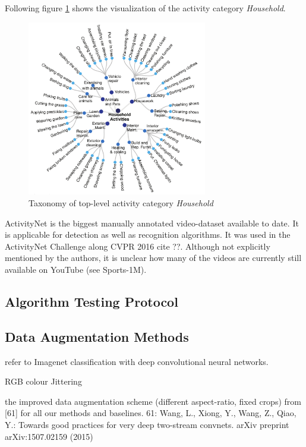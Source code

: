Following figure \ref{fig:activitynet_taxonomy} shows the visualization of the activity category \textit{Household}.
\begin{figure}[H]
    \centering
    \includegraphics[width=0.7\textwidth]{img_datasets/activitynet_taxonomy}
    \caption{Taxonomy of top-level activity category \textit{Household}}
    \label{fig:activitynet_taxonomy}
\end{figure}

ActivityNet is the biggest manually annotated video-dataset available to date.
It is applicable for detection as well as recognition algorithms.
It was used in the ActivityNet Challenge along CVPR 2016 cite ??.
Although not explicitly mentioned by the authors, it is unclear how many of the videos are currently still available on YouTube (see Sports-1M).


\subsection{Algorithm Testing Protocol}


\subsection{Data Augmentation Methods}

refer to Imagenet classification with deep convolutional neural networks.

RGB colour Jittering

the improved data augmentation scheme (different aspect-ratio, fixed crops)
from [61] for all our methods and baselines.
61: Wang, L., Xiong, Y., Wang, Z., Qiao, Y.: Towards good practices for very
deep two-stream convnets. arXiv preprint arXiv:1507.02159 (2015)

